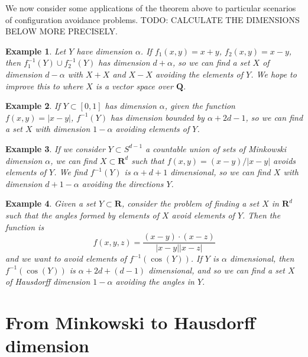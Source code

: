 \documentclass{report}
\theoremstyle{plain}
\newtheorem*{example}{Example}
\theoremstyle{plain}
\begin{document}
We now consider some applications of the theorem above to particular scenarios of configuration avoidance problems. TODO: CALCULATE THE DIMENSIONS BELOW MORE PRECISELY.

\begin{example}
    Let $Y$ have dimension $\alpha$. If $f_1(x,y) = x + y$, $f_2(x,y) = x - y$, then $f_1^{-1}(Y) \cup f_2^{-1}(Y)$ has dimension $d + \alpha$, so we can find a set $X$ of dimension $d - \alpha$ with $X + X$ and $X - X$ avoiding the elements of $Y$. We hope to improve this to where $X$ is a vector space over $\mathbf{Q}$.
\end{example}

\begin{example}
    If $Y \subset [0,1]$ has dimension $\alpha$, given the function $f(x,y) = |x - y|$, $f^{-1}(Y)$ has dimension bounded by $\alpha + 2d - 1$, so we can find a set $X$ with dimension $1 - \alpha$ avoiding elements of $Y$.
\end{example}

\begin{example}
    If we consider $Y \subset S^{d-1}$ a countable union of sets of Minkowski dimension $\alpha$, we can find $X \subset \mathbf{R}^d$ such that $f(x,y) = (x - y)/|x-y|$ avoids elements of $Y$. We find $f^{-1}(Y)$ is $\alpha + d + 1$ dimensional, so we can find $X$ with dimension $d + 1 - \alpha$ avoiding the directions $Y$.
\end{example}

\begin{example}
    Given a set $Y \subset \mathbf{R}$, consider the problem of finding a set $X$ in $\mathbf{R}^d$ such that the angles formed by elements of $X$ avoid elements of $Y$. Then the function is
    \[ f(x,y,z) = \frac{(x - y) \cdot (x - z)}{|x - y| |x - z|} \]
    and we want to avoid elements of $f^{-1}(\cos(Y))$. If $Y$ is $\alpha$ dimensional, then $f^{-1}(\cos(Y))$ is $\alpha + 2d + (d - 1)$ dimensional, and so we can find a set $X$ of Hausdorff dimension $1 - \alpha$ avoiding the angles in $Y$.
\end{example}

\section{From Minkowski to Hausdorff dimension}
\end{document}
